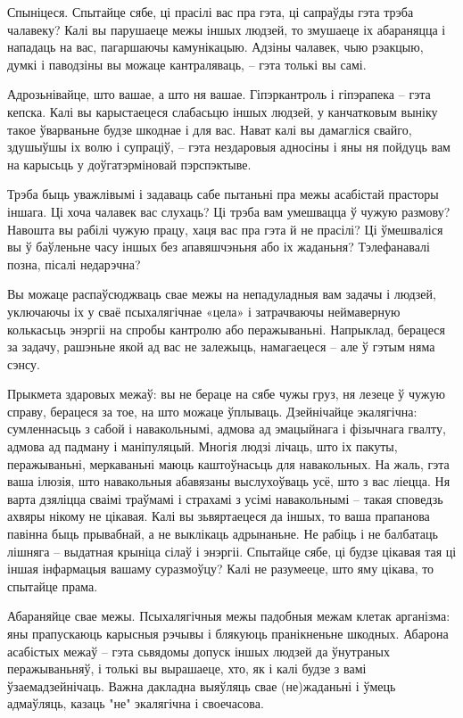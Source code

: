 Спыніцеся. Спытайце сябе, ці прасілі вас пра гэта, ці сапраўды гэта трэба чалавеку? Калі вы парушаеце межы іншых людзей, то змушаеце іх абараняцца і нападаць на вас, пагаршаючы камунікацыю. Адзіны чалавек, чыю рэакцыю, думкі і паводзіны вы можаце кантраляваць, – гэта толькі вы самі.

Адрозьнівайце, што вашае, а што ня вашае. Гіпэркантроль і гіпэрапека – гэта кепска. Калі вы карыстаецеся слабасьцю іншых людзей, у канчатковым выніку такое ўварваньне будзе шкоднае і для вас. Нават калі вы дамагліся свайго, здушыўшы іх волю і супраціў, – гэта нездаровыя адносіны і яны ня пойдуць вам на карысьць у доўгатэрміновай пэрспэктыве.

Трэба быць уважлівымі і задаваць сабе пытаньні пра межы асабістай прасторы іншага. Ці хоча чалавек вас слухаць? Ці трэба вам умешвацца ў чужую размову? Навошта вы рабілі чужую працу, хаця вас пра гэта й не прасілі? Ці ўмешваліся вы ў баўленьне часу іншых без апавяшчэньня або іх жаданьня? Тэлефанавалі позна, пісалі недарэчна?

Вы можаце распаўсюджваць свае межы на непадуладныя вам задачы і людзей, уключаючы іх у сваё псыхалягічнае «цела» і затрачваючы неймаверную колькасьць энэргіі на спробы кантролю або перажываньні. Напрыклад, берацеся за задачу, рашэньне якой ад вас не залежыць, намагаецеся – але ў гэтым няма сэнсу. 

Прыкмета здаровых межаў: вы не бераце на сябе чужы груз, ня лезеце ў чужую справу, берацеся за тое, на што можаце ўплываць. Дзейнічайце экалягічна: сумленнасьць з сабой і навакольнымі, адмова ад эмацыйнага і фізычнага гвалту, адмова ад падману і маніпуляцый. Многія людзі лічаць, што іх пакуты, перажываньні, меркаваньні маюць каштоўнасьць для навакольных. На жаль, гэта ваша ілюзія, што навакольныя абавязаны выслухоўваць усё, што з вас ліецца. Ня варта дзяліцца сваімі траўмамі і страхамі з усімі навакольнымі – такая споведзь ахвяры нікому не цікавая. Калі вы зьвяртаецеся да іншых, то ваша прапанова павінна быць прывабнай, а не выклікаць адрынаньне. Не рабіць і не балбатаць лішняга – выдатная крыніца сілаў і энэргіі. Спытайце сябе, ці будзе цікавая тая ці іншая інфармацыя вашаму суразмоўцу? Калі не разумееце, што яму цікава, то спытайце прама.

Абараняйце свае межы. Псыхалягічныя межы падобныя межам клетак арганізма: яны прапускаюць карысныя рэчывы і блякуюць пранікненьне шкодных. Абарона асабістых межаў – гэта сьвядомы допуск іншых людзей да ўнутраных перажываньняў, і толькі вы вырашаеце, хто, як і калі будзе з вамі ўзаемадзейнічаць. Важна дакладна выяўляць свае (не)жаданьні і ўмець адмаўляць, казаць "не" экалягічна і своечасова.

